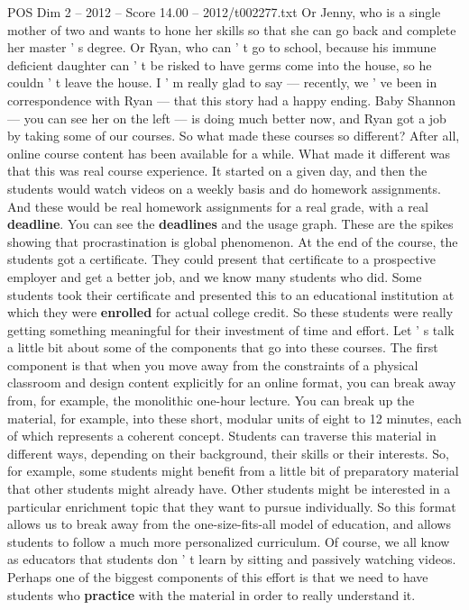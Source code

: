 \begin{textsample}{POS Dim 2 – 2012 – Score 14.00 – 2012/t002277.txt}
Or Jenny, who is a single mother of two and wants to hone her skills so that she can go back and complete her master ' s degree.
Or Ryan, who can ' t go to school, because his immune deficient daughter can ' t be risked to have germs come into the house, so he couldn ' t leave the house.
I ' m really glad to say — recently, we ' ve been in correspondence with Ryan — that this story had a happy ending.
Baby Shannon — you can see her on the left — is doing much better now, and Ryan got a job by taking some of our courses.
So what made these courses so different?
After all, online course content has been available for a while.
What made it different was that this was real course experience.
It started on a given day, and then the students would watch videos on a weekly basis and do homework assignments.
And these would be real homework assignments for a real grade, with a real \textbf{deadline}.
You can see the \textbf{deadlines} and the usage graph.
These are the spikes showing that procrastination is global phenomenon.
At the end of the course, the students got a certificate.
They could present that certificate to a prospective employer and get a better job, and we know many students who did.
Some students took their certificate and presented this to an educational institution at which they were \textbf{enrolled} for actual college credit.
So these students were really getting something meaningful for their investment of time and effort.
Let ' s talk a little bit about some of the components that go into these courses.
The first component is that when you move away from the constraints of a physical classroom and design content explicitly for an online format, you can break away from, for example, the monolithic one-hour lecture.
You can break up the material, for example, into these short, modular units of eight to 12 minutes, each of which represents a coherent concept.
Students can traverse this material in different ways, depending on their background, their skills or their interests.
So, for example, some students might benefit from a little bit of preparatory material that other students might already have.
Other students might be interested in a particular enrichment topic that they want to pursue individually.
So this format allows us to break away from the one-size-fits-all model of education, and allows students to follow a much more personalized curriculum.
Of course, we all know as educators that students don ' t learn by sitting and passively watching videos.
Perhaps one of the biggest components of this effort is that we need to have students who \textbf{practice} with the material in order to really understand it.

\end{textsample}
